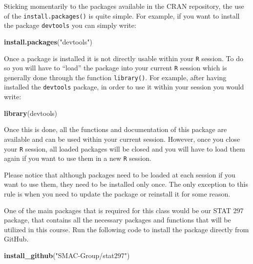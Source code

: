 \documentclass[]{book}
\newenvironment{Shaded}{\begin{snugshade}}{\end{snugshade}}
\newcommand{\KeywordTok}[1]{\textcolor[rgb]{0.13,0.29,0.53}{\textbf{{#1}}}}
\newcommand{\StringTok}[1]{\textcolor[rgb]{0.31,0.60,0.02}{{#1}}}
\newcommand{\NormalTok}[1]{{#1}}
\theoremstyle{definition}
\theoremstyle{definition}
\theoremstyle{remark}
\let\BeginKnitrBlock\begin \let\EndKnitrBlock\end
\begin{document}
Sticking momentarily to the packages available in the CRAN repository,
the use of the \texttt{install.packages()} is quite simple. For example,
if you want to install the package \texttt{devtools} you can simply
write:

\begin{Shaded}
\begin{Highlighting}[]
\KeywordTok{install.packages}\NormalTok{(}\StringTok{"devtools"}\NormalTok{)}
\end{Highlighting}
\end{Shaded}

Once a package is installed it is not directly usable within your
\texttt{R} session. To do so you will have to ``load'' the package into
your current \texttt{R} session which is generally done through the
function \texttt{library()}. For example, after having installed the
\texttt{devtools} package, in order to use it within your session you
would write:

\begin{Shaded}
\begin{Highlighting}[]
\KeywordTok{library}\NormalTok{(devtools)}
\end{Highlighting}
\end{Shaded}

Once this is done, all the functions and documentation of this package
are available and can be used within your current session. However, once
you close your \texttt{R} session, all loaded packages will be closed
and you will have to load them again if you want to use them in a new
\texttt{R} session.

\BeginKnitrBlock{rmdnote}
Please notice that although packages need to be loaded at each session
if you want to use them, they need to be installed only once. The only
exception to this rule is when you need to update the package or
reinstall it for some reason.
\EndKnitrBlock{rmdnote}

One of the main packages that is required for this class would be our
STAT 297 package, that contains all the necessary packages and functions
that will be utilized in this course. Run the following code to install
the package directly from GitHub.

\begin{Shaded}
\begin{Highlighting}[]
\KeywordTok{install_github}\NormalTok{(}\StringTok{"SMAC-Group/stat297"}\NormalTok{)}
\end{Highlighting}
\end{Shaded}
\end{document}

